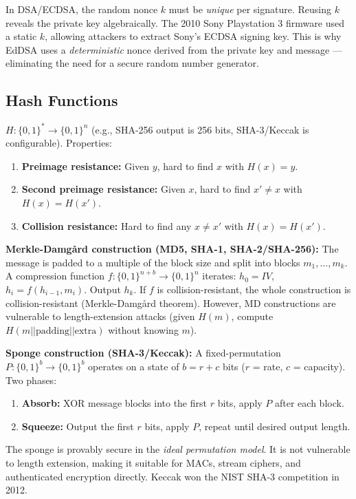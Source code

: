 In DSA/ECDSA, the random nonce $k$ must be \emph{unique} per signature. Reusing $k$ reveals the private key algebraically. The 2010 Sony Playstation 3 firmware used a static $k$, allowing attackers to extract Sony's ECDSA signing key. This is why EdDSA uses a \emph{deterministic} nonce derived from the private key and message — eliminating the need for a secure random number generator.

\subsection{Hash Functions}
\label{sec:crypto:hash}

\begin{definition}
$H: \{0,1\}^* \to \{0,1\}^n$ (e.g., SHA-256 output is 256 bits, SHA-3/Keccak is configurable).
Properties:
\begin{enumerate}
\item \textbf{Preimage resistance:} Given $y$, hard to find $x$ with $H(x) = y$.
\item \textbf{Second preimage resistance:} Given $x$, hard to find $x' \neq x$ with $H(x) = H(x')$.
\item \textbf{Collision resistance:} Hard to find any $x \neq x'$ with $H(x) = H(x')$.
\end{enumerate}
\end{definition}

\textbf{Merkle-Damgård construction (MD5, SHA-1, SHA-2/SHA-256):} The message is padded to a multiple of the block size and split into blocks $m_1, \dots, m_k$. A compression function $f: \{0,1\}^{n+b} \to \{0,1\}^n$ iterates: $h_0 = IV$, $h_i = f(h_{i-1}, m_i)$. Output $h_k$. If $f$ is collision-resistant, the whole construction is collision-resistant (Merkle-Damgård theorem). However, MD constructions are vulnerable to length-extension attacks (given $H(m)$, compute $H(m || \text{padding} || \text{extra})$ without knowing $m$).

\textbf{Sponge construction (SHA-3/Keccak):} A fixed-permutation $P: \{0,1\}^{b} \to \{0,1\}^{b}$ operates on a state of $b = r + c$ bits ($r$ = rate, $c$ = capacity). Two phases:
\begin{enumerate}
\item \textbf{Absorb:} XOR message blocks into the first $r$ bits, apply $P$ after each block.
\item \textbf{Squeeze:} Output the first $r$ bits, apply $P$, repeat until desired output length.
\end{enumerate}
The sponge is provably secure in the \emph{ideal permutation model}. It is not vulnerable to length extension, making it suitable for MACs, stream ciphers, and authenticated encryption directly. Keccak won the NIST SHA-3 competition in 2012.

